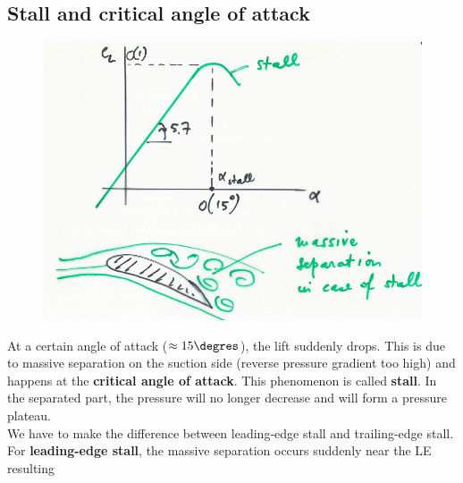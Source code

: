 		\subsection{Stall and critical angle of attack}
			\begin{figure}
			\vspace{-5mm}
			\includegraphics[scale=0.26]{ch2/18}
			\end{figure}
			At a certain angle of attack ($\approx 15\degres$), the lift suddenly drops. This is due to massive separation on the suction side (reverse pressure gradient too high) and happens at the \textbf{critical angle of attack}. This phenomenon is called \textbf{stall}. In the separated part, the pressure will no longer decrease and will form a pressure plateau. \\
			
			We have to make the difference between leading-edge stall and trailing-edge stall. For \textbf{leading-edge stall}, the massive separation occurs suddenly near the LE resulting \newpage
			
